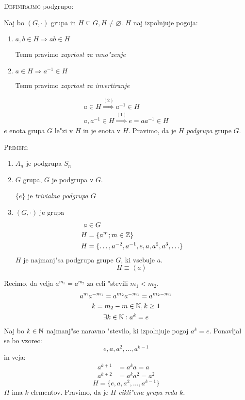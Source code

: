 \textsc{Definirajmo} podgrupo:

Naj bo $(G, \cdot)$ grupa in $H \subseteq G, H \neq \varnothing$. $H$ naj izpolnjuje pogoja:
\begin{enumerate}[(1)]
	\item $a, b \in H \Rightarrow ab \in H$
	
	Temu pravimo \emph{zaprtost za mno"zenje}
	
	\item $a \in H \Rightarrow a^{-1} \in H$
	
	Temu pravimo \emph{zaprtost za invertiranje}
\end{enumerate}

\begin{gather*}
a \in H \stackrel{(2)}{\Rightarrow} a^{-1} \in H \\
a, a^{-1} \in H \stackrel{(1)}{\Rightarrow} e = aa^{-1} \in H
\end{gather*}
$e$ enota grupa $G$ le"zi v $H$ in je enota v $H$. Pravimo, da je $H$ \emph{podgrupa} grupe $G$.

\textsc{Primeri:}
\begin{enumerate}[(1)]
	\item $A_n$ je podgrupa $S_n$
	\item $G$ grupa, $G$ je podgrupa v $G$.
	
	$\{e\}$ je \emph{trivialna podgrupa} $G$
	
	\item $(G, \cdot)$ je grupa
	\begin{align*}
	a &\in G \\
	H &= \{a^m; m \in \mathbb{Z}\} \\
	H &= \{\ldots, a^{-2}, a^{-1}, e ,a, a^2, a^3, \ldots \} \\
	\end{align*}
	$H$ je najmanj"sa podgrupa grupe $G$, ki vsebuje $a$.
	\begin{equation*}
	H \equiv \left<a\right>
	\end{equation*}
\end{enumerate}

Recimo, da velja $a^{m_1} = a^{m_2}$ za celi "stevili $m_1 < m_2$.
\begin{gather*}
a^m a^{-m_1} = a^{m_2} a^{-m_1} = a^{m_2 - m_1} \\
k = m_2 - m \in \mathbb{N}, k \geq 1 \\
\exists k \in \mathbb{N}: a^k = e
\end{gather*}
Naj bo $k \in \mathbb{N}$ najmanj"se naravno "stevilo, ki izpolnjuje pogoj $a^k = e$. Ponavljal se bo vzorec:
\begin{equation*}
e, a, a^2, \ldots, a^{k-1}
\end{equation*}
in veja:
\begin{align*}
	a^{k+1} &= a^k a = a \\
	a^{k+2} &= a^k a^2 = a^2
\end{align*}
\begin{equation*}
H = \{e, a, a^2, \ldots, a^{k-1}\}
\end{equation*}
$H$ ima $k$ elementov. Pravimo, da je $H$ \emph{cikli"cna grupa reda $k$}.